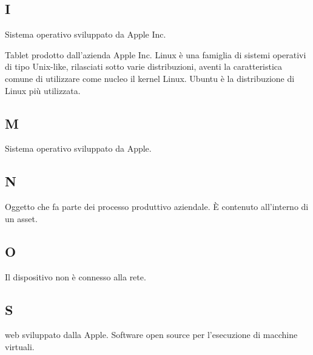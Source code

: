 	\subsection{I}
		Sistema operativo sviluppato da Apple Inc.
	
		Tablet prodotto dall'azienda Apple Inc.
		Linux è una famiglia di sistemi operativi di tipo Unix-like, rilasciati sotto varie distribuzioni, aventi la caratteristica comune di utilizzare come nucleo il kernel Linux. Ubuntu è la distribuzione di Linux più utilizzata.
	\subsection{M}
		Sistema operativo sviluppato da Apple.
	\subsection{N}
		Oggetto che fa parte dei processo produttivo aziendale. È contenuto all'interno di un asset.
	\subsection{O}
		Il dispositivo non è connesso alla rete.
		
	\subsection{S}
		 web sviluppato dalla Apple.
		Software open source per l'esecuzione di macchine virtuali.
